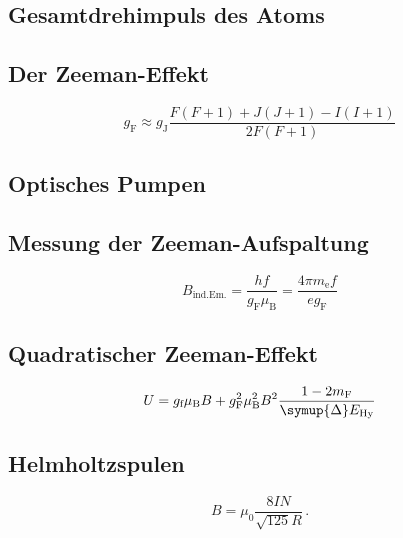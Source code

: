 \subsection{Gesamtdrehimpuls des Atoms}
\subsection{Der Zeeman-Effekt}

\begin{equation}
    g_\text{F}\approx g_\text{J}\frac{F\left(F+1\right)+J\left(J+1\right)-I\left(I+1\right)}{2F\left(F+1\right)}
    \label{eqn:lande}
\end{equation}

\subsection{Optisches Pumpen}
\subsection{Messung der Zeeman-Aufspaltung}

\begin{equation*}
    B_\text{ind.Em.} = \frac{hf}{g_\text{F}\mu_\text{B}} = \frac{4\pi m_\text{e} f}{e g_\text{F}}
    \label{eqn:lin}
\end{equation*}

\subsection{Quadratischer Zeeman-Effekt}

\begin{equation}
    U = g_\text{f}\mu_\text{B} B + g_\text{F}^2\mu_\text{B}^2 B^2 \frac{1-2 m_\text{F}}{\symup{\Delta}E_\text{Hy}}
    \label{eqn:quad} 
\end{equation}

\subsection{Helmholtzspulen}

\begin{equation}
    B = \mu_0 \frac{8IN}{\sqrt{125}R}\,.
    \label{eqn:helm}
\end{equation}

